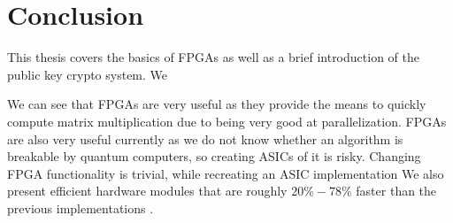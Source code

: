 \chapter{Conclusion\label{conclusion}}

This thesis covers the basics of FPGAs as well as a brief introduction of the public key 
crypto system. We

We can see that FPGAs are very useful as they
provide the means to quickly compute matrix multiplication due to being very
good at parallelization. FPGAs are also very useful currently as we do not know whether an algorithm
is breakable by quantum computers, so creating ASICs of it is risky. Changing FPGA functionality
is trivial, while recreating an ASIC implementation
We also present efficient hardware modules that
are roughly $20\% - 78\%$ faster than the previous implementations
\citep{FPGA_Post_Quantum_Primitives}.

